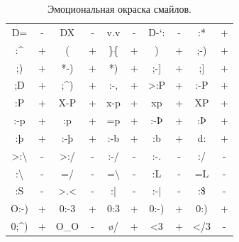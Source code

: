 \begin{table}[h]
\begin{tabular}{|cc|cc|cc|cc|cc|}
D=                          & -              & DX                     & -              & v.v              & -              & D-‘:           & -              & :*             & +              \\
:\textasciicircum *         & +              & (                      & +              & \}\{            & +              & )              & +              & ;-)            & +              \\
;)                          & +              & *-)                    & +              & *)               & +              & ;-{]}          & +              & ;{]}           & +              \\
;D                          & +              & ;\textasciicircum )    & +              & :-,              & +              & \textgreater:P & +              & :-P            & +              \\
:P                          & +              & X-P                    & +              & x-p              & +              & xp             & +              & XP             & +              \\
:-p                         & +              & :p                     & +              & =p               & +              & :-Þ            & +              & :Þ             & +              \\
:þ                          & +              & :-þ                    & +              & :-b              & +              & :b             & +              & d:             & +              \\
\textgreater:\textbackslash & -              & \textgreater:/         & -              & :-/              & -              & :-.            & -              & :/             & -              \\
:\textbackslash             & -              & =/                     & -              & =\textbackslash  & -              & :L             & -              & =L             & -              \\
:S                          & -              & \textgreater.\textless & -              & :|               & -              & :-|            & -              & :\$            & -              \\
O:-)                        & +              & 0:-3                   & +              & 0:3              & +              & 0:-)           & +              & 0:)            & +              \\
0;\textasciicircum )        & +              & O\_O                   & -              & \o/              & +              & \textless3     & +              & \textless/3    & -              \\ \hline
\end{tabular}\label{tab:smileys}\caption{Эмоциональная окраска смайлов.}
\end{table}

